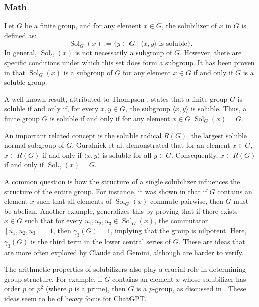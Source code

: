 \documentclass{article}
\begin{document}
\subsubsection{Math}
Let \( G \) be a finite group, and for any element \( x \in G \), the solubilizer of \( x \) in \( G \) is defined as:
\[
\operatorname{Sol}_G(x) := \{ y \in G \mid \langle x, y \rangle \text{ is soluble} \}.
\]
In general, \(\operatorname{Sol}_G(x)\) is not necessarily a subgroup of \( G \). However, there are specific conditions under which this set does form a subgroup. It has been proven in \cite{haireuven2013nonsolvable} that \(\operatorname{Sol}_G(x)\) is a subgroup of \( G \) for any element \( x \in G \) if and only if \( G \) is a soluble group.

A well-known result, attributed to Thompson \cite{Thompson}, states that a finite group \( G \) is soluble if and only if, for every \( x, y \in G \), the subgroup \( \langle x, y \rangle \) is soluble. Thus, a finite group \( G \) is soluble if and only if for any element \( x \in G \) \(\operatorname{Sol}_G(x) = G \).

An important related concept is the soluble radical \( R(G) \), the largest soluble normal subgroup of \( G \). Guralnick et al. \cite{GKPS} demonstrated that for an element \( x \in G \), \( x \in R(G) \) if and only if \( \langle x, y \rangle \) is soluble for all \( y \in G \). Consequently, \( x \in R(G) \) if and only if \(\operatorname{Sol}_G(x) = G\).

A common question is how the structure of a single solubilizer influences the structure of the entire group. For instance, it was shown in \cite{haireuven2013nonsolvable} that if \( G \) contains an element \( x \) such that all elements of \(\operatorname{Sol}_G(x)\) commute pairwise, then \( G \) must be abelian. Another example, \cite{akbari2020solubility} generalizes this by proving that if there exists \( x \in G \) such that for every \( u_1, u_2, u_3 \in \operatorname{Sol}_G(x) \), the commutator \( [u_1, u_2, u_3] = 1 \), then \( \gamma_3(G) = 1 \), implying that the group is nilpotent. Here, \( \gamma_3(G) \) is the third term in the lower central series of \( G \). These are ideas that are more often explored by Claude and Gemini, although are harder to verify.

The arithmetic properties of solubilizers also play a crucial role in determining group structure. For example, if \( G \) contains an element \( x \) whose solubilizer has order \( p \) or \( p^2 \) (where \( p \) is a prime), then \( G \) is a \( p \)-group, as discussed in \cite{akbari2022solubilizer}. These ideas seem to be of heavy focus for ChatGPT.
\end{document}
